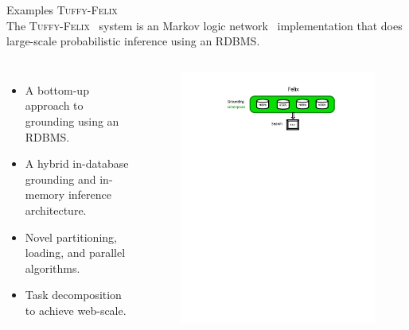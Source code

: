\documentclass[onlymath,xcolor=pdftex,dvipsnames,table]{beamer}
\newcommand{\tuffy}{\textsc{Tuffy}\xspace}
\newcommand{\felix}{\textsc{Felix}\xspace}
\newcommand{\head}[1]{{\large\color{OliveGreen}#1\\[5pt]}}
\begin{document}
\begin{frame}{Examples}
\head{\tuffy-\felix}
The \tuffy-\felix~\cite{DBLP:journals/pvldb/NiuRDS11,2011arXiv1108.0294N} system is an Markov logic network~\cite{richardson2006markov} implementation that does large-scale probabilistic inference using an RDBMS.
\begin{columns}[c]
  \begin{itemize}
    \item A bottom-up approach to grounding using an RDBMS.
    \item A hybrid in-database grounding and in-memory inference architecture.
    \item Novel partitioning, loading, and parallel algorithms.
    \item Task decomposition to achieve web-scale.
  \end{itemize}

  \begin{figure}
    \centering
    \includegraphics[clip,trim=125pt 500pt 125pt 30pt,width=\linewidth]{distfelix.pdf}
  \end{figure}
\end{columns}
\end{frame}
\end{document}
